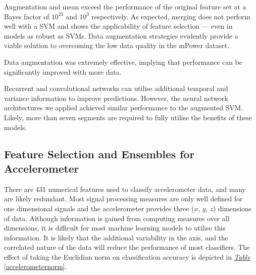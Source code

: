 \documentclass[12pt, twoside]{book}
\begin{document}
Augmentation and mean exceed the performance of the original feature set at a Bayes factor of $10^{23}$ and $10^3$ respectively. As expected, merging does not perform well with a SVM and shows the applicability of feature selection --- even in models as robust as SVMs. Data augmentation strategies evidently provide a viable solution to overcoming the low data quality in the mPower dataset. 

\begin{highlight}
Data augmentation was extremely effective, implying that performance can be significantly improved with more data.
\end{highlight}

Recurrent and convolutional networks can utilise additional temporal and variance information to improve predictions. However, the neural network architectures we applied achieved similar performance to the augmented SVM. Likely, more than seven segments are required to fully utilise the benefits of these models.



\subsection{Feature Selection and Ensembles for Accelerometer}
There are 431 numerical features used to classify accelerometer data, and many are likely redundant. Most signal processing measures are only well defined for one dimensional signals and the accelerometer provides three ($x$, $y$, $z$) dimensions of data. Although information is gained from computing measures over all dimensions, it is difficult for most machine learning models to utilise this information. It is likely that the additional variability in the axis, and the correlated nature of the data will reduce the performance of most classifiers. The effect of taking the Euclidian norm on classification accuracy is depicted in \textit{\hyperref[accelerometernorm]{Table}} \ref{accelerometernorm}.
\end{document}
